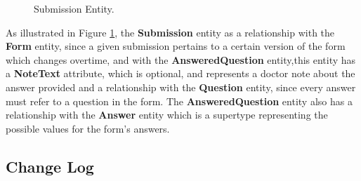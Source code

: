 \begin{figure}[H]
	\begin{center}
	\end{center}
	\caption{Submission Entity.}\label{fig:submission_entity}
\end{figure}

As illustrated in Figure \ref{fig:submission_entity}, the \textbf{Submission} entity as a relationship with the \textbf{Form} entity, since a given submission pertains to a certain version of the form which changes overtime, and with the \textbf{AnsweredQuestion} entity,this entity has a \textbf{NoteText} attribute, which is optional, and represents a doctor note about the answer provided and a relationship with the \textbf{Question} entity, since every answer must refer to a question in the form.
The \textbf{AnsweredQuestion} entity also has a relationship with the \textbf{Answer} entity which is a supertype representing the possible values for the form's answers.



\subsection{Change Log}

